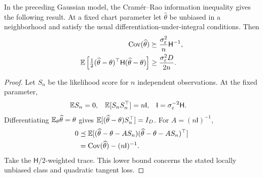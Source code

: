 \begin{proposition}
In the preceding Gaussian model, the Cram\'er--Rao information inequality
\cite{vandervaart1998asymptotic} gives the following result. At a fixed chart parameter let
$\widehat\theta$ be unbiased in a neighborhood and satisfy the usual
differentiation-under-integral conditions. Then
\begin{align}
\operatorname{Cov}(\widehat\theta)
&\succeq\frac{\sigma_\varepsilon^2}{n}\mathsf H^{-1},\\
\mathbb E\left[\tfrac12(\widehat\theta-\theta)^\top
\mathsf H(\widehat\theta-\theta)\right]
&\geq\frac{\sigma_\varepsilon^2D}{2n}.
\label{eq:local-cramer-rao}
\end{align}
\end{proposition}
\begin{proof}
Let $S_n$ be the likelihood score for $n$ independent observations.
At the fixed parameter,
\begin{align}
\mathbb E S_n&=0,&
\mathbb E[S_nS_n^\top]&=n\mathsf I,&
\mathsf I&=\sigma_\varepsilon^{-2}\mathsf H .
\end{align}
Differentiating $\mathbb E_\theta\widehat\theta=\theta$ gives
$\mathbb E[(\widehat\theta-\theta)S_n^\top]=I_D$.
For $A=(n\mathsf I)^{-1}$,
\begin{align}
0&\preceq
\mathbb E[(\widehat\theta-\theta-AS_n)
(\widehat\theta-\theta-AS_n)^\top]\\
&=\operatorname{Cov}(\widehat\theta)-(n\mathsf I)^{-1}.
\end{align}
Take the $\mathsf H/2$-weighted trace. This lower bound concerns
the stated locally unbiased class and quadratic tangent loss.
\end{proof}
